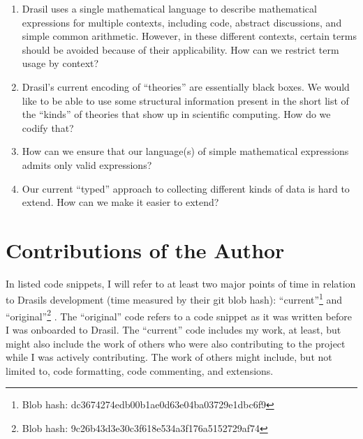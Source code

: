 \begin{enumerate}

      \item[\namedlabel{rq:lang_division}{RQ1}] Drasil uses a single
            mathematical language to describe mathematical expressions for
            multiple contexts, including code, abstract discussions, and simple
            common arithmetic. However, in these different contexts, certain
            terms should be avoided because of their applicability. How can we
            restrict term usage by context?

      \item[\namedlabel{rq:modelkinds}{RQ2}] Drasil's current encoding of
            ``theories'' are essentially black boxes. We would like to be able
            to use some structural information present in the short list of the
            ``kinds'' of theories that show up in scientific computing. How do
            we codify that?

      \item[\namedlabel{rq:typing}{RQ3}] How can we ensure that our language(s)
            of simple mathematical expressions admits only valid expressions?

      \item[\namedlabel{rq:chunkdb}{RQ4}] Our current ``typed'' approach to
            collecting different kinds of data is hard to extend. How can we
            make it easier to extend?

\end{enumerate}

\section{Contributions of the Author}
\label{sec:intro:contributions}

In listed code snippets, I will refer to at least two major points of time in
relation to Drasils development (time measured by their git blob hash):
``current''\footnote{Blob hash: dc3674274edb00b1ae0d63e04ba03729e1dbc6f9} and
``original''\footnote{Blob hash: 9c26b43d3e30c3f618e534a3f176a5152729af74}
. The ``original'' code refers
to a code snippet as it was written before I was onboarded to Drasil. The
``current'' code includes my work, at least, but might also include the work of
others who were also contributing to the project while I was actively
contributing. The work of others might include, but not limited to, code
formatting, code commenting, and extensions.

